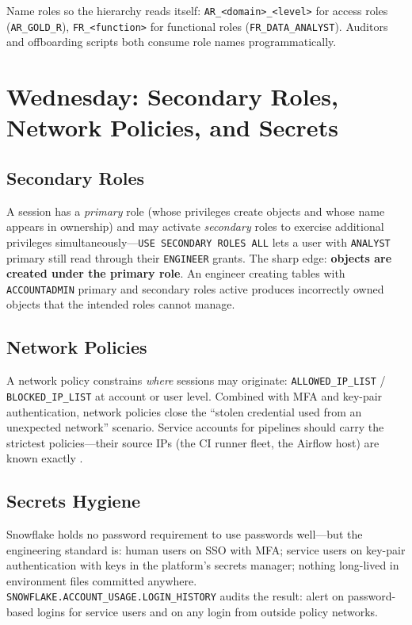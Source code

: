 \begin{tipbox}
Name roles so the hierarchy reads itself: \texttt{AR\_<domain>\_<level>} for access roles (\texttt{AR\_GOLD\_R}), \texttt{FR\_<function>} for functional roles (\texttt{FR\_DATA\_ANALYST}). Auditors and offboarding scripts both consume role names programmatically.
\end{tipbox}

\section{Wednesday: Secondary Roles, Network Policies, and Secrets}
\subsection{Secondary Roles}
A session has a \emph{primary} role (whose privileges create objects and whose name appears in ownership) and may activate \emph{secondary} roles to exercise additional privileges simultaneously---\texttt{USE SECONDARY ROLES ALL} lets a user with \texttt{ANALYST} primary still read through their \texttt{ENGINEER} grants. The sharp edge: \textbf{objects are created under the primary role}. An engineer creating tables with \texttt{ACCOUNTADMIN} primary and secondary roles active produces incorrectly owned objects that the intended roles cannot manage.

\subsection{Network Policies}
A network policy constrains \emph{where} sessions may originate: \texttt{ALLOWED\_IP\_LIST} / \texttt{BLOCKED\_IP\_LIST} at account or user level. Combined with MFA and key-pair authentication, network policies close the ``stolen credential used from an unexpected network'' scenario. Service accounts for pipelines should carry the strictest policies---their source IPs (the CI runner fleet, the Airflow host) are known exactly \cite{snowflakeNetworkPoliciesDocs}.

\subsection{Secrets Hygiene}
Snowflake holds no password requirement to use passwords well---but the engineering standard is: human users on SSO with MFA; service users on key-pair authentication with keys in the platform's secrets manager; nothing long-lived in environment files committed anywhere. \texttt{SNOWFLAKE.ACCOUNT\_USAGE.LOGIN\_HISTORY} audits the result: alert on password-based logins for service users and on any login from outside policy networks.

